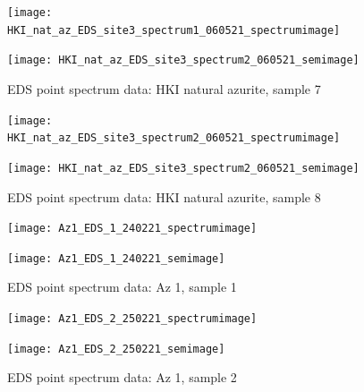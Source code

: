 \begin{figure}[H]
\centering
\begin{minipage}{.45\textwidth}
  \centering
  \texttt{[image: HKI\_nat\_az\_EDS\_site3\_spectrum1\_060521\_spectrumimage]}
\end{minipage}
\begin{minipage}{.45\textwidth}
  \centering
  \texttt{[image: HKI\_nat\_az\_EDS\_site3\_spectrum2\_060521\_semimage]}
\end{minipage}
\caption[EDS point spectrum data: HKI natural azurite, sample 7]{EDS point spectrum data: HKI natural azurite, sample 7}
\label{fig:hki_point_eds_7}
\end{figure}

\begin{figure}[H]
\centering
\begin{minipage}{.45\textwidth}
  \centering
  \texttt{[image: HKI\_nat\_az\_EDS\_site3\_spectrum2\_060521\_spectrumimage]}
\end{minipage}
\begin{minipage}{.45\textwidth}
  \centering
  \texttt{[image: HKI\_nat\_az\_EDS\_site3\_spectrum2\_060521\_semimage]}
\end{minipage}
\caption[EDS point spectrum data: HKI natural azurite, sample 8]{EDS point spectrum data: HKI natural azurite, sample 8}
\label{fig:hki_point_eds_8}
\end{figure}




\begin{figure}[H]
\centering
\begin{minipage}{.45\textwidth}
  \centering
  \texttt{[image: Az1\_EDS\_1\_240221\_spectrumimage]}
\end{minipage}
\begin{minipage}{.45\textwidth}
  \centering
  \texttt{[image: Az1\_EDS\_1\_240221\_semimage]}
\end{minipage}
\caption[EDS point spectrum data: Az 1, sample 1]{EDS point spectrum data: Az 1, sample 1}
\label{fig:az1_point_eds_1}
\end{figure}

\begin{figure}[H]
\centering
\begin{minipage}{.45\textwidth}
  \centering
  \texttt{[image: Az1\_EDS\_2\_250221\_spectrumimage]}
\end{minipage}
\begin{minipage}{.45\textwidth}
  \centering
  \texttt{[image: Az1\_EDS\_2\_250221\_semimage]}
\end{minipage}
\caption[EDS point spectrum data: Az 1, sample 2]{EDS point spectrum data: Az 1, sample 2}
\label{fig:az1_point_eds_2}
\end{figure}

